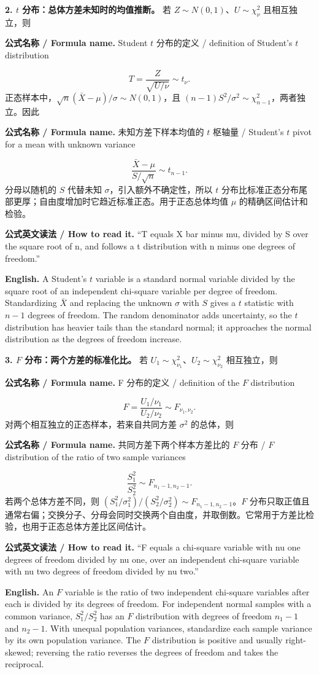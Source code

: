 \documentclass[UTF8,11pt,a4paper]{ctexart}
\newcommand{\EN}[1]{\par\noindent\textbf{English.} #1\par}
\newcommand{\READ}[1]{\par\noindent\textbf{公式英文读法 / How to read it.} #1\par}
\newcommand{\FORMULA}[2]{\par\noindent\textbf{公式名称 / Formula name.} #1 / #2\par}
\begin{document}
\noindent\textbf{2. $t$ 分布：总体方差未知时的均值推断。} 若 $Z\sim N(0,1)$、$U\sim\chi^2_\nu$ 且相互独立，则
\FORMULA{Student $t$ 分布的定义}{definition of Student's $t$ distribution}
\[
T=\frac{Z}{\sqrt{U/\nu}}\sim t_\nu.
\]
正态样本中，$\sqrt n(\bar X-\mu)/\sigma\sim N(0,1)$，且 $(n-1)S^2/\sigma^2\sim\chi^2_{n-1}$，两者独立。因此
\FORMULA{未知方差下样本均值的 $t$ 枢轴量}{Student's $t$ pivot for a mean with unknown variance}
\[
\frac{\bar X-\mu}{S/\sqrt n}\sim t_{n-1}.
\]
分母以随机的 $S$ 代替未知 $\sigma$，引入额外不确定性，所以 $t$ 分布比标准正态分布尾部更厚；自由度增加时它趋近标准正态。用于正态总体均值 $\mu$ 的精确区间估计和检验。
\READ{“T equals X bar minus mu, divided by S over the square root of n, and follows a t distribution with n minus one degrees of freedom.”}
\EN{A Student's $t$ variable is a standard normal variable divided by the square root of an independent chi-square variable per degree of freedom. Standardizing $\bar X$ and replacing the unknown $\sigma$ with $S$ gives a $t$ statistic with $n-1$ degrees of freedom. The random denominator adds uncertainty, so the $t$ distribution has heavier tails than the standard normal; it approaches the normal distribution as the degrees of freedom increase.}

\noindent\textbf{3. $F$ 分布：两个方差的标准化比。} 若 $U_1\sim\chi^2_{\nu_1}$、$U_2\sim\chi^2_{\nu_2}$ 相互独立，则
\FORMULA{F 分布的定义}{definition of the $F$ distribution}
\[
F=\frac{U_1/\nu_1}{U_2/\nu_2}\sim F_{\nu_1,\nu_2}.
\]
对两个相互独立的正态样本，若来自共同方差 $\sigma^2$ 的总体，则
\FORMULA{共同方差下两个样本方差比的 $F$ 分布}{$F$ distribution of the ratio of two sample variances}
\[
\frac{S_1^2}{S_2^2}\sim F_{n_1-1,n_2-1}.
\]
若两个总体方差不同，则 $(S_1^2/\sigma_1^2)/(S_2^2/\sigma_2^2)\sim F_{n_1-1,n_2-1}$。$F$ 分布只取正值且通常右偏；交换分子、分母会同时交换两个自由度，并取倒数。它常用于方差比检验，也用于正态总体方差比区间估计。
\READ{“F equals a chi-square variable with nu one degrees of freedom divided by nu one, over an independent chi-square variable with nu two degrees of freedom divided by nu two.”}
\EN{An $F$ variable is the ratio of two independent chi-square variables after each is divided by its degrees of freedom. For independent normal samples with a common variance, $S_1^2/S_2^2$ has an $F$ distribution with degrees of freedom $n_1-1$ and $n_2-1$. With unequal population variances, standardize each sample variance by its own population variance. The $F$ distribution is positive and usually right-skewed; reversing the ratio reverses the degrees of freedom and takes the reciprocal.}
\end{document}

